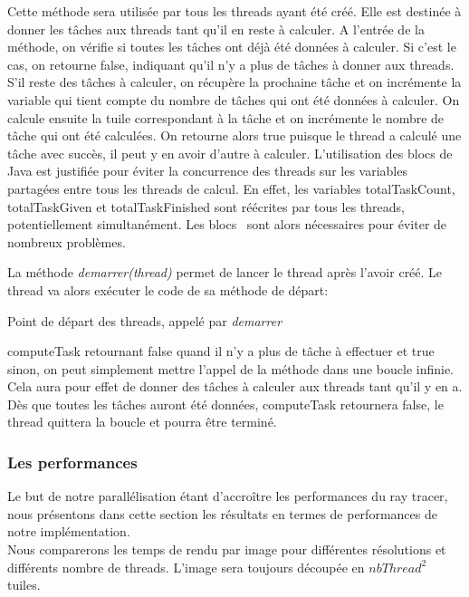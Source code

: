 \documentclass[11pt]{article}
\begin{document}
Cette méthode sera utilisée par tous les threads ayant été créé. Elle est destinée à donner les tâches aux threads tant qu'il en reste à calculer. A l'entrée de la méthode, on vérifie si toutes les tâches ont déjà été données à calculer. Si c'est le cas, on retourne false, indiquant qu'il n'y a plus de tâches à donner aux threads. S'il reste des tâches à calculer, on récupère la prochaine tâche et on incrémente la variable qui tient compte du nombre de tâches qui ont été données à calculer. On calcule ensuite la tuile correspondant à la tâche et on incrémente le nombre de tâche qui ont été calculées. On retourne alors true puisque le thread a calculé une tâche avec succès, il peut y en avoir d'autre à calculer. L'utilisation des blocs  \color{black} de Java est justifiée pour éviter la concurrence des threads sur les variables partagées entre tous les threads de calcul. En effet, les variables totalTaskCount, totalTaskGiven et totalTaskFinished sont réécrites par tous les threads, potentiellement simultanément. Les blocs \color{black}\ sont alors nécessaires pour éviter de nombreux problèmes.

La méthode \textit{demarrer(thread)} permet de lancer le thread après l'avoir créé. Le thread va alors exécuter le code de sa méthode de départ:

\begin{algorithm}[H]
	

	\caption{Point de départ des threads, appelé par \textit{demarrer}}
	\label{methodeDemarrer}
\end{algorithm}
computeTask retournant false quand il n'y a plus de tâche à effectuer et true sinon, on peut simplement mettre l'appel de la méthode dans une boucle infinie. Cela aura pour effet de donner des tâches à calculer aux threads tant qu'il y en a. Dès que toutes les tâches auront été données, computeTask retournera false, le thread quittera la boucle et pourra être terminé.

\subsubsection{Les performances}

Le but de notre parallélisation étant d'accroître les performances du ray tracer, nous présentons dans cette section les résultats en termes de performances de notre implémentation.\\
Nous comparerons les temps de rendu par image pour différentes résolutions et différents nombre de threads. L'image sera toujours découpée en $nbThread^2$ tuiles.
\end{document}

